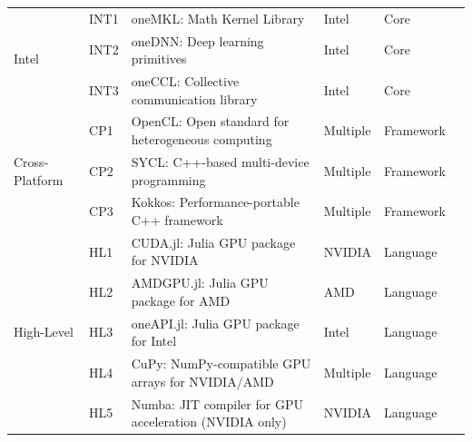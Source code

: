 \begin{table}[htbp]
\begin{tabular}{llp{8cm}lll}
		\hline
		\multirow{3}{*}{\small Intel}
		                         & \small INT1        & \small oneMKL: Math Kernel Library                                & \small Intel           & \small Core          & \small \cite{noauthor_uxlfoundationonemath_2025}      \\[1ex]
		                         & \small INT2        & \small oneDNN: Deep learning primitives                           & \small Intel           & \small Core          & \small \cite{onednn_contributors_oneapi_2025}         \\[1ex]
		                         & \small INT3        & \small oneCCL: Collective communication library                   & \small Intel           & \small Core          & \small \cite{noauthor_uxlfoundationoneccl_2025}       \\
		\hline
		\multirow{3}{*}{\small Cross-Platform}
		                         & \small CP1         & \small OpenCL: Open standard for heterogeneous computing          & \small Multiple        & \small Framework     & \small \cite{noauthor_khronosgroupopencl-sdk_2025}    \\[1ex]
		                         & \small CP2         & \small SYCL: C++-based multi-device programming                   & \small Multiple        & \small Framework     & \small \cite{noauthor_khronosgroupsycl-docs_2025}     \\[1ex]
		                         & \small CP3         & \small Kokkos: Performance-portable C++ framework                 & \small Multiple        & \small Framework     & \small \cite{trott_kokkos_2022}                       \\

		\hline
		\multirow{5}{*}{\small High-Level}
		                         & \small HL1         & \small CUDA.jl: Julia GPU package for NVIDIA                      & \small NVIDIA          & \small Language      & \small \cite{noauthor_juliagpucudajl_2025}            \\[1ex]
		                         & \small HL2         & \small AMDGPU.jl: Julia GPU package for AMD                       & \small AMD             & \small Language      & \small \cite{noauthor_juliagpuamdgpujl_2025}          \\[1ex]
		                         & \small HL3         & \small oneAPI.jl: Julia GPU package for Intel                     & \small Intel           & \small Language      & \small \cite{besard_oneapijl_2022}                    \\[1ex]
		                         & \small HL4         & \small CuPy: NumPy-compatible GPU arrays for NVIDIA/AMD           & \small Multiple        & \small Language      & \small \cite{okuta_cupy_2017, noauthor_cupycupy_2025} \\[1ex]
		                         & \small HL5         & \small Numba: JIT compiler for GPU acceleration (NVIDIA only)     & \small NVIDIA          & \small Language      & \small \cite{noauthor_numbanumba_2025}                \\
		\hline
	\end{tabular}
\end{table}